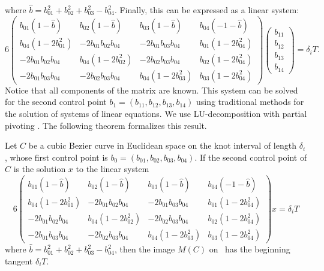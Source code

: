 \documentclass[12pt]{article}
\begin{document}
where $\hat{b} = b_{01}^2 + b_{02}^2 + b_{03}^2 - b_{04}^2$.
Finally, this can be expressed as a linear system:
\[
6 \left( \begin{array}{cccc}
b_{01}(1-\hat{b}) & b_{02}(1-\hat{b}) & b_{03}(1-\hat{b}) & b_{04}(-1-\hat{b}) \\
b_{04}(1-2b_{01}^2) & -2b_{01}b_{02}b_{04} & -2b_{01}b_{03}b_{04} & b_{01}(1-2b_{04}^2) \\
-2b_{01}b_{02}b_{04} & b_{04} (1-2b_{02}^2) & -2b_{02}b_{03}b_{04} & b_{02}(1-2b_{04}^2) \\
-2b_{01}b_{03}b_{04} & -2b_{02}b_{03}b_{04} & b_{04}(1-2b_{03}^2) & b_{03}(1-2b_{04}^2)
\end{array} \right)
\left( \begin{array}{c} b_{11} \\ b_{12} \\ b_{13} \\ b_{14} \end{array} \right)
= \delta_i T.
\]
%
Notice that all components of the matrix are known.
This system can be solved for the second control point $b_1 = (b_{11},b_{12},b_{13},b_{14})$
using traditional methods for the solution of systems of linear
equations.
We use LU-decomposition with partial pivoting \cite{golubvanloan89}.
The following theorem formalizes this result.

\begin{theorem}
Let $C$ be a cubic Bezier curve in Euclidean space 
on the knot interval of length $\delta_i$,
whose first control
point is $b_0 = (b_{01}, b_{02}, b_{03}, b_{04})$.
If the second control point of $C$ is the solution $x$ to the linear system
\[
6 \left( \begin{array}{cccc}
b_{01}(1-\hat{b}) & b_{02}(1-\hat{b}) & b_{03}(1-\hat{b}) & b_{04}(-1-\hat{b}) \\
b_{04}(1-2b_{01}^2) & -2b_{01}b_{02}b_{04} & -2b_{01}b_{03}b_{04} & b_{01}(1-2b_{04}^2) \\
-2b_{01}b_{02}b_{04} & b_{04} (1-2b_{02}^2) & -2b_{02}b_{03}b_{04} & b_{02}(1-2b_{04}^2) \\
-2b_{01}b_{03}b_{04} & -2b_{02}b_{03}b_{04} & b_{04}(1-2b_{03}^2) & b_{03}(1-2b_{04}^2)
\end{array} \right)
x
= \delta_i T
\]
where $\hat{b} = b_{01}^2 + b_{02}^2 + b_{03}^2 - b_{04}^2$,
then the image $M(C)$ on \ has the beginning tangent $\delta_i T$.
\end{theorem}
\end{document}
